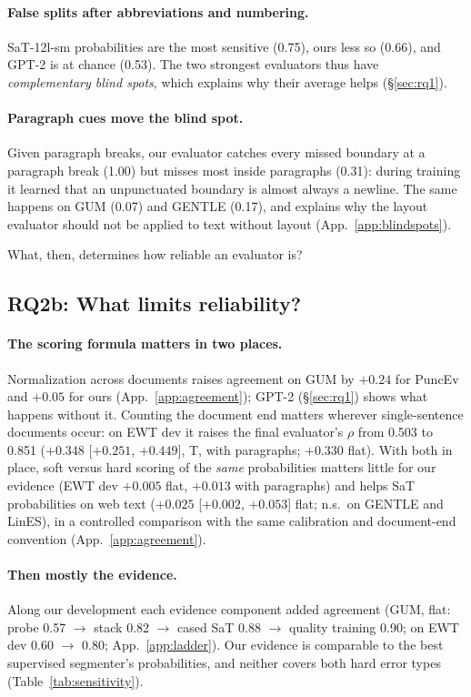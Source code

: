 \paragraph{False splits after abbreviations and numbering.} SaT-12l-sm probabilities are the most sensitive (0.75),
ours less so (0.66), and GPT-2 is at chance (0.53). The two strongest evaluators thus have \emph{complementary blind
spots}, which explains why their average helps (\S\ref{sec:rq1}).

\paragraph{Paragraph cues move the blind spot.} Given paragraph breaks, our evaluator catches every missed boundary at a
paragraph break (1.00) but misses most inside paragraphs (0.31): during training it learned that an unpunctuated boundary
is almost always a newline. The same happens on GUM (0.07) and GENTLE (0.17), and explains why the layout evaluator
should not be applied to text without layout (App.~\ref{app:blindspots}).

What, then, determines how reliable an evaluator is?

\subsection{RQ2b: What limits reliability?}
\label{sec:rq2b}

\paragraph{The scoring formula matters in two places.} Normalization across documents raises agreement on GUM by
$+0.24$ for PuncEv and $+0.05$ for ours (App.~\ref{app:agreement}); GPT-2 (\S\ref{sec:rq1}) shows what happens
without it. Counting the document end matters wherever single-sentence documents occur: on EWT dev it raises the final
evaluator's $\rho$ from 0.503 to 0.851 ($+0.348$ [$+0.251$, $+0.449$], T, with paragraphs; $+0.330$ flat). With both in
place, soft versus hard scoring of the \emph{same} probabilities matters little for our evidence (EWT dev $+0.005$ flat,
$+0.013$ with paragraphs) and helps SaT probabilities on web text ($+0.025$ [$+0.002$, $+0.053$] flat; n.s.\ on GENTLE
and LinES), in a controlled comparison with the same calibration and document-end convention
(App.~\ref{app:agreement}).

\paragraph{Then mostly the evidence.} Along our development each evidence component added agreement (GUM, flat: probe
0.57 $\to$ stack 0.82 $\to$ cased SaT 0.88 $\to$ quality training 0.90; on EWT dev 0.60 $\to$ 0.80;
App.~\ref{app:ladder}). Our evidence is comparable to the best supervised segmenter's probabilities, and neither covers
both hard error types (Table~\ref{tab:sensitivity}).

